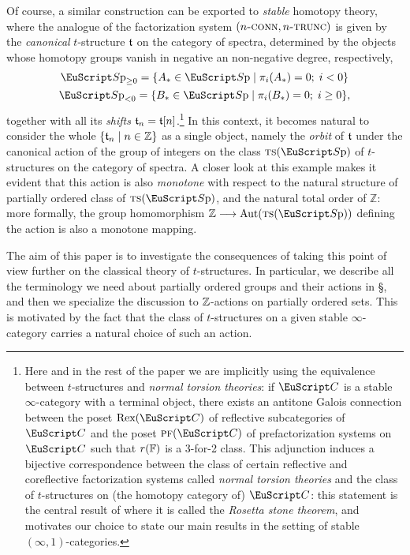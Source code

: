 Of course, a similar construction can be exported to \emph{stable} homotopy theory, where the analogue of the factorization system $(n\textsc{-conn}, n\textsc{-trunc})$ is given by the \emph{canonical} $t$-structure $\mathfrak{t}$ on the category of spectra, determined by the objects whose homotopy groups vanish in negative an non-negative degree, respectively,
\begin{gather*}
\Sp_{\ge 0} = \{  A_* \in \Sp \mid \pi_i(A_*)=0;\; i< 0 \}\\
\Sp_{< 0} = \{ B_* \in \Sp \mid \pi_i(B_*)=0;\; i\ge 0 \},
\end{gather*}
together with all its \emph{shifts} $\mathfrak{t}_n=\mathfrak{t}[n]$.\footnote{Here and in the rest of the paper we are implicitly using the equivalence between $t$-structures and \emph{normal torsion theories}: if $\C$ is a stable $\infty$-category with a terminal object, there exists an antitone Galois connection between the poset $\text{Rex}(\C)$ of reflective subcategories of $\C$ and the poset $\pf(\C)$ of prefactorization systems on $\C$ such that $r(\mathbb{F})$ is a 3-for-2 class. This adjunction induces a bijective correspondence between the class of certain reflective and coreflective factorization systems called \emph{normal torsion theories} and the class of $t$-structures on (the homotopy category of) $\C$: this statement is the central result of \cite{FL0} where it is called the \emph{Rosetta stone theorem}, and motivates our choice to state our main results in the setting of stable $(\infty,1)$-categories.} In this context, 
it becomes natural to consider the whole $\{\mathfrak{t}_n\mid n\in\mathbb{Z}\}$ as a single object, 
namely the \emph{orbit} of $\mathfrak{t}$ under 
the canonical action of the group of integers on the class $\ts(\Sp)$ of $t$-structures on the category of spectra.
A closer look at this example 
makes it evident that this action is also \emph{monotone} with respect to the natural structure of partially ordered class of $\ts(\Sp)$, and the natural total order of $\mathbb{Z}$: more formally, the group homomorphism $\mathbb{Z}\to \text{Aut}(\ts(\Sp))$ defining the action is also a monotone mapping.

The aim of this paper is to investigate the consequences of taking this point of view further on the classical theory of $t$-structures.  In particular, we describe all the terminology we need about partially ordered groups and their actions in §, and then we specialize the discussion to $\mathbb{Z}$\hyp{}actions on partially ordered sets. This is motivated by the fact that the class of $t$-structures on a given stable $\infty$-category carries a natural choice of such an action.

